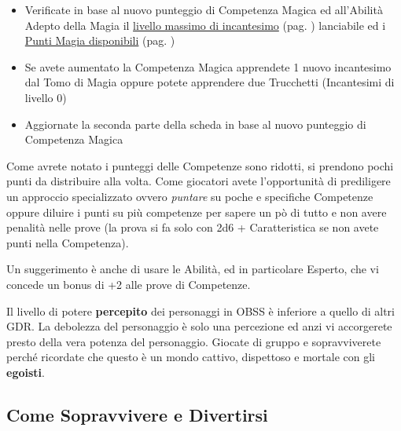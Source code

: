 \begin{multicols}{2}
\begin{itemize}[leftmargin=*]
\item Verificate in base al nuovo punteggio di Competenza Magica ed all'Abilità Adepto della Magia il \hyperlink{scuoleelivelli}{livello massimo di incantesimo} (pag. \pageref{scuoleelivelli}) lanciabile ed i \hyperlink{magiepuntimagia}{Punti Magia disponibili} (pag. \pageref{magiepuntimagia})
\item Se avete aumentato la Competenza Magica apprendete 1 nuovo incantesimo dal Tomo di Magia oppure potete apprendere due Trucchetti (Incantesimi di livello 0)
\item Aggiornate la seconda parte della scheda in base al nuovo punteggio di Competenza Magica
\end{itemize}

Come avrete notato i punteggi delle Competenze sono ridotti, si prendono pochi punti da distribuire alla volta.
Come giocatori avete l'opportunità di prediligere un approccio specializzato ovvero \emph{puntare} su poche e specifiche Competenze oppure diluire i punti su più competenze per sapere un pò di tutto e non avere penalità nelle prove (la prova si fa solo con 2d6 + Caratteristica se non avete punti nella Competenza).

Un suggerimento è anche di usare le Abilità, ed in particolare Esperto, che vi concede un bonus di +2 alle prove di Competenze.

\begin{changemargin}{0.3cm}{0.3cm}\begin{enfasi}
Il livello di potere \textbf{percepito} dei personaggi in OBSS è inferiore a quello di altri GDR. La debolezza del personaggio è solo una percezione ed anzi vi accorgerete presto della vera potenza del personaggio. Giocate di gruppo e sopravviverete perché ricordate che questo è un mondo cattivo, dispettoso e mortale con gli \textbf{egoisti}.
\end{enfasi}\end{changemargin}


\subsection{Come Sopravvivere e Divertirsi}\label{suggerimentigiocatori}


\end{multicols}
